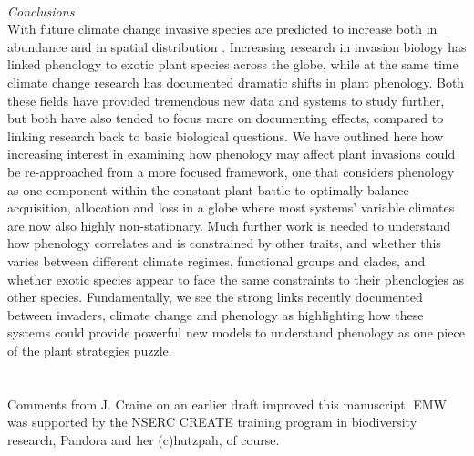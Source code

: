 \documentclass[11pt,a4paper,oneside]{article}
\begin{document}
 \\
\noindent \emph{Conclusions}\\
With future climate change invasive species are predicted to increase both in abundance and in spatial distribution \citep{Team:2007hk}. Increasing research in invasion biology has linked phenology to exotic plant species across the globe, while at the same time climate change research has documented dramatic shifts in plant phenology. Both these fields have provided tremendous new data and systems to study further, but both have also tended to focus more on documenting effects, compared to linking research back to basic biological questions. We have outlined here how increasing interest in examining how phenology may affect plant invasions could be re-approached from a more focused framework, one that considers phenology as one component within the constant plant battle to optimally balance acquisition, allocation and loss in a globe where most systems' variable climates are now also highly non-stationary. Much further work is needed to understand how phenology correlates and is constrained by other traits, and whether this varies between different climate regimes, functional groups and clades, and whether exotic species appear to face the same constraints to their phenologies as other species. Fundamentally, we see the strong links recently documented between invaders, climate change and phenology as highlighting how these systems could provide powerful new models to understand phenology as one piece of the plant strategies puzzle. \\
\\
\\
Comments from J. Craine on an earlier draft improved this manuscript. EMW was supported by the NSERC CREATE training program in biodiversity research, Pandora and her (c)hutzpah, of course.  

\newpage

\end{document}
